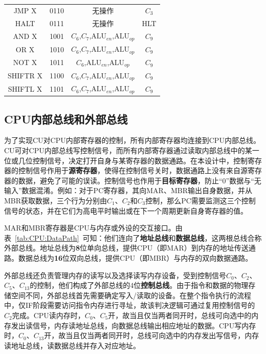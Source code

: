 \documentclass[lang=cn,a4paper,newtx]{elegantpaper}
\begin{document}
\begin{longtable}{cccc}
  JMP X & 0110 &
  
  无操作 & 
  $C_3$ \\

  HALT & 0111 &
  
  无操作 & 
  HLT \\

  
  \midrule
  AND X & 1001 &
  
  $C_6$,$C_7$,$\text{ALU}_{en}$,$\text{ALU}_{op}$ &
  $C_9$ \\

  OR X & 1010 &
  
  $C_6$,$C_7$,$\text{ALU}_{en}$,$\text{ALU}_{op}$ &
  $C_9$ \\

  NOT X & 1011 &
  
  $C_6$,$\text{ALU}_{en}$,$\text{ALU}_{op}$ &
  $C_9$ \\

  SHIFTR X& 1100 &
  $C_6$,$C_7$,$\text{ALU}_{en}$,$\text{ALU}_{op}$ &
  $C_9$ \\

  SHIFTL X& 1101 &
  $C_6$,$C_7$,$\text{ALU}_{en}$,$\text{ALU}_{op}$ &
  $C_9$ \\

\end{longtable}

\subsection{CPU内部总线和外部总线}\label{sec:ExternalControl}
为了实现CU对CPU内部寄存器的控制，所有内部寄存器均连接到CPU内部总线。CU可对CPU内部总线写控制信号，而所有内部寄存器通过读取内部总线中的某一位或几位控制信号，决定打开自身与某寄存器的数据通路。在本设计中，控制寄存器的控制信号作用于\textbf{源寄存器}，使得在控制信号关时，数据通路上没有来自源寄存器的数据，避免了可能的误读。控制信号也作用于\textbf{目标寄存器}，防止“0”数据与“无输入”数据混淆。例如：对于PC寄存器，其向MAR、MBR输出自身数据，并从MBR获取数据，三个行为分别由$C_1$、$C_2$和$C_3$控制，那么PC需要监测这三个控制信号的状态，并在它们为高电平时输出或在下一个周期更新自身寄存器的值。

MAR和MBR寄存器是CPU与内存或外设的交互接口。由表~\ref{tab:CPU:DataPath}~可知：他们连向了\textbf{地址总线}和\textbf{数据总线}，这两根总线合称外部总线。地址总线为\textbf{8}位单向总线，提供CPU（即MAR）到内存的地址传送通路。数据总线为\textbf{16}位双向总线，提供CPU（即MBR）与内存的双向数据通路。

外部总线还负责管理内存的读写以及选择读写内存设备，受到控制信号$C_0$、$C_2$、$C_5$、$C_{13}$的控制，他们构成了外部总线的4位\textbf{控制总线}。由于指令和数据的物理存储空间不同，外部总线首先需要确定写入/读取的设备。在整个指令执行的流程中，仅IF阶段需要访问指令内存进行寻址，故该判决逻辑可通过复用控制信号的$C_2$完成。CPU读内存时，$C_0$、$C_5$开，故当且仅当两者同开时，总线可向选中的内存发出读信号，内存读地址总线，向数据总线输出相应地址的数据。CPU写内存时，$C_0$、$C_{13}$开，故当且仅当两者同开时，总线可向选中的内存发出写信号，内存读地址总线，读数据总线并存入对应地址。
\end{document}
